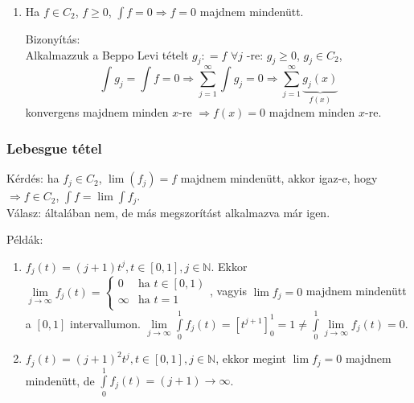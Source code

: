 \documentclass[12pt,a4paper]{scrartcl}
\providecommand{\tightlist}{%
  \setlength{\itemsep}{0pt}\setlength{\parskip}{0pt}}
\newenvironment{bizonyitas}{}{}
\newenvironment{pelda}{}{}
\begin{document}
\begin{enumerate}
\begin{bizonyitas}
  \end{bizonyitas}
\item
  Ha \(f \in C_{2}\), \(f \geq 0\),
  \(\left. {\int f} = 0\Rightarrow f = 0 \right.\) majdnem mindenütt.

  \begin{bizonyitas}

  Bizonyítás:\\
  Alkalmazzuk a Beppo Levi tételt \(g_{j}: = f\) \(\forall j\) -re:
  \(g_{j} \geq 0\), \(g_{j} \in C_{2}\),
  \[\int {{g_j}}  = \int f  = 0 \Rightarrow \mathop \sum \limits_{j = 1}^\infty  \int {{g_j}}  = 0 \Rightarrow \mathop \sum \limits_{j = 1}^\infty  \underbrace {{g_j}\left( x \right)}_{f\left( x \right)}\]
  konvergens majdnem minden \(x\)-re
  \(\left. \Rightarrow f\left( x \right) = 0 \right.\) majdnem minden
  \(x\)-re.

  \end{bizonyitas}
\end{enumerate}

\hypertarget{lebesgue-tetel}{%
\subsubsection{Lebesgue tétel}\label{lebesgue-tetel}}

Kérdés: ha \(f_{j} \in C_{2}\), \(\lim\left( f_{j} \right) = f\) majdnem
mindenütt, akkor igaz-e, hogy
\(\left. \Rightarrow f \in C_{2} \right.\),
\({\int f} = \lim{\int f_{j}}\).\\
Válasz: általában nem, de más megszorítást alkalmazva már igen.

\begin{pelda}

Példák:

\begin{enumerate}
\def\labelenumi{\arabic{enumi}.}
\tightlist
\item
  \(f_{j}\left( t \right) = \left( {j + 1} \right)t^{j},t \in \left\lbrack 0,1 \right\rbrack,j \in {\mathbb{N}}\).
  Ekkor
  \(\lim\limits_{j\rightarrow\infty}f_{j}\left( t \right) = \left\{ \begin{matrix} 0 & {\text{ha~}t \in \left\lbrack 0,1 \right)} \\ \infty & {\text{ha~}t = 1} \\ \end{matrix} \right.\),
  vagyis \(\lim f_{j} = 0\) majdnem mindenütt a
  \(\left\lbrack 0,1 \right\rbrack\) intervallumon.
  \(\lim\limits_{j\rightarrow\infty}{\int\limits_{0}^{1}{f_{j}\left( t \right)}} = \left\lbrack t^{j + 1} \right\rbrack_{0}^{1} = 1 \neq {\int\limits_{0}^{1}{\lim\limits_{j\rightarrow\infty}f_{j}\left( t \right)}} = 0\).
\item
  \(f_{j}\left( t \right) = \left( {j + 1} \right)^{2}t^{j},t \in \left\lbrack 0,1 \right\rbrack,j \in {\mathbb{N}}\),
  ekkor megint \(\lim f_{j} = 0\) majdnem mindenütt, de
  \(\left. {\int\limits_{0}^{1}{f_{j}\left( t \right)}} = \left( {j + 1} \right)\rightarrow\infty \right.\).
\end{enumerate}

\end{pelda}
\end{document}
